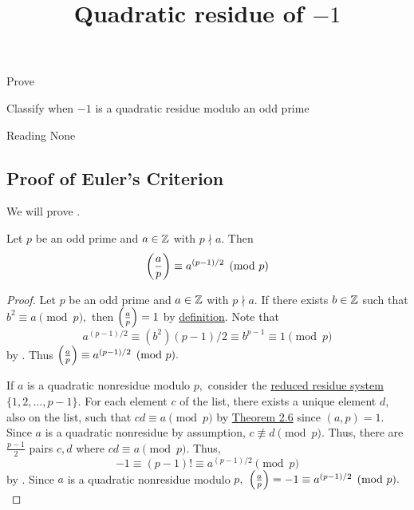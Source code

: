 \documentclass{../ximera}
\title{Quadratic residue of $-1$}
\begin{document}
\begin{abstract}
\end{abstract}
\maketitle


\begin{obj}
    \item Prove 
	\item Classify when $-1$ is a quadratic residue modulo an odd prime
\end{obj}


\begin{pre}
    \item[Reading] None
\end{pre}

\subsection{Proof of Euler's Criterion}

We will prove . 

\begin{thm*}
    Let $p$ be an odd prime and $a\in\mathbb Z$ with $p\nmid a.$ Then \[\left(\frac{a}{p}\right)\equiv a^{(p-1)/2}\pmod{p}\]
\end{thm*}

\begin{proof}
	Let $p$ be an odd prime and $a\in\mathbb Z$ with $p\nmid a.$ If there exists $b\in\mathbb Z$ such that $b^2\equiv a\pmod{p},$ then $\left(\frac{a}{p}\right)=1$ by \hyperref[defn:legendre]{definition}.
	Note that \[a^{(p-1)/2}\equiv (b^2){(p-1)/2}\equiv b^{p-1}\equiv 1\pmod{p}\]
	by . Thus $\left(\frac{a}{p}\right)\equiv a^{(p-1)/2}\pmod{p}.$
	
	If $a$ is a quadratic nonresidue modulo $p,$ consider the \hyperref[defn:reduced-res-sys]{reduced residue system} $\{1,2,\dots,p-1\}.$ For each element $c$ of the list, there exists a unique element $d$, also on the list, such that $cd\equiv a\pmod{p}$ by \hyperref[thm:lin-cong-solutions]{Theorem 2.6} since $(a,p)=1$. Since $a$ is a quadratic nonresidue by assumption, $c\not\equiv d\pmod{p}.$ Thus, there are $\frac{p-1}{2}$ pairs $c,d$ where $cd\equiv a\pmod{p}.$ Thus, 
		\[
			-1\equiv (p-1)! \equiv a^{(p-1)/2}\pmod{p}
		\]
	by . Since $a$ is a quadratic nonresidue modulo $p,$ $\left(\frac{a}{p}\right)=-1\equiv a^{(p-1)/2}\pmod{p}.$
\end{proof}
\end{document}
